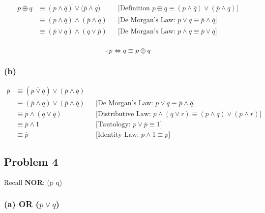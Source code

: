 \documentclass[10pt]{article}
\begin{document}
\begin{align*}
  \overline{p \oplus q} &\equiv \overline{(p \land \overline{q})
  \lor (\overline{p} \land q}) && \text{[Definition } p \oplus q
  \equiv (p \land \overline{q}) \lor (\overline{p} \land q)] \\
    &\equiv \overline{(p \land \overline{q})} \land \overline{(\overline{p}
      \land q)} && \text{[De Morgan's Law: } \overline{p \lor q}
      \equiv \overline{p} \land \overline{q}] \\
    &\equiv (\overline{p} \lor q) \land (q \lor \overline{p})
      && \text{[De Morgan's Law: } \overline{p \land q}
      \equiv \overline{p} \lor \overline{q}] \\
\end{align*}

$$\therefore p \iff q \equiv \overline{p \oplus q}$$

\subsubsection*{(b)}

\begin{align*}
  \overline{p} &\equiv (\overline{p \lor \overline{q}}) \lor (\overline{p}
  \land \overline{q}) \\
    &\equiv (\overline{p} \land q) \lor (\overline{p} \land \overline{q}) &&
      \text{[De Morgan's Law: } \overline{p \lor q} \equiv \overline{p}
      \land \overline{q}] \\
    &\equiv \overline{p} \land (q \lor \overline{q}) && \text{[Distributive Law: }
      p \land (q \lor r) \equiv (p \land q) \lor (p \land r)] \\
    &\equiv \overline{p} \land 1 && \text{[Tautology: } p \lor
      \overline{p} \equiv 1] \\
    &\equiv \overline{p} && \text{[Identity Law: } p \land 1 \equiv p]
\end{align*}

\subsection*{Problem 4}

Recall \textbf{NOR}: (p \downarrow q) \equiv {} \land {}
\equiv {} 

\subsubsection*{(a) OR ($p \lor q$)}
\end{document}
